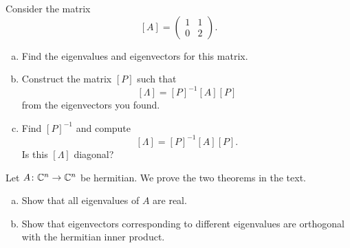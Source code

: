\documentclass[12pt]{article} %
\begin{document}
\begin{problem}
Consider the matrix
\[
[A] = \begin{pmatrix} 1 & 1 \\ 0 & 2 \end{pmatrix}.
\]
\begin{enumerate}[(a)]
    \item Find the eigenvalues and eigenvectors for this matrix.
    \item Construct the matrix $[P]$ such that
    \[
    [\Lambda] = [P]^{-1}[A][P]
    \]
    from the eigenvectors you found. 
    \item Find $[P]^{-1}$ and compute
    \[
    [\Lambda] = [P]^{-1}[A][P].
    \]
    Is this $[\Lambda]$ diagonal?
\end{enumerate} 
\end{problem}

\begin{problem}
Let $A \colon \mathbb{C}^n \to \mathbb{C}^n$ be hermitian.  We prove the two theorems in the text.
\begin{enumerate}[(a)]
    \item Show that all eigenvalues of $A$ are real.
    \item Show that eigenvectors corresponding to different eigenvalues are orthogonal with the hermitian inner product.
\end{enumerate}
\end{problem}
\end{document}
